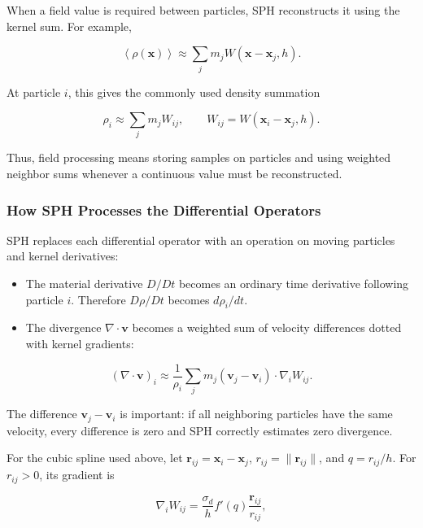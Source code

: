 \documentclass[11pt]{article}
\begin{document}
When a field value is required between particles, SPH reconstructs it using
the kernel sum. For example,

\begin{equation}
    \left\langle \rho(\mathbf{x}) \right\rangle
    \approx \sum_j m_j W(\mathbf{x}-\mathbf{x}_j,h).
\end{equation}

At particle $i$, this gives the commonly used density summation

\begin{equation}
    \rho_i \approx \sum_j m_j W_{ij},
    \qquad
    W_{ij}=W(\mathbf{x}_i-\mathbf{x}_j,h).
\end{equation}

Thus, field processing means storing samples on particles and using weighted
neighbor sums whenever a continuous value must be reconstructed.

\subsubsection{How SPH Processes the Differential Operators}

SPH replaces each differential operator with an operation on moving particles
and kernel derivatives:

\begin{itemize}
    \item The material derivative $D/Dt$ becomes an ordinary time derivative
    following particle $i$. Therefore
    $D\rho/Dt$ becomes $d\rho_i/dt$.
    \item The divergence $\nabla\cdot\mathbf{v}$ becomes a weighted sum of
    velocity differences dotted with kernel gradients:
\end{itemize}

\begin{equation}
    (\nabla\cdot\mathbf{v})_i
    \approx
    \frac{1}{\rho_i}
    \sum_j m_j(\mathbf{v}_j-\mathbf{v}_i)
    \cdot\nabla_i W_{ij}.
\end{equation}

The difference $\mathbf{v}_j-\mathbf{v}_i$ is important: if all neighboring
particles have the same velocity, every difference is zero and SPH correctly
estimates zero divergence.

For the cubic spline used above, let
$\mathbf{r}_{ij}=\mathbf{x}_i-\mathbf{x}_j$,
$r_{ij}=\lVert\mathbf{r}_{ij}\rVert$, and $q=r_{ij}/h$. For
$r_{ij}>0$, its gradient is

\begin{equation}
    \nabla_i W_{ij}
    = \frac{\sigma_d}{h}f'(q)
    \frac{\mathbf{r}_{ij}}{r_{ij}},
\end{equation}
\end{document}
